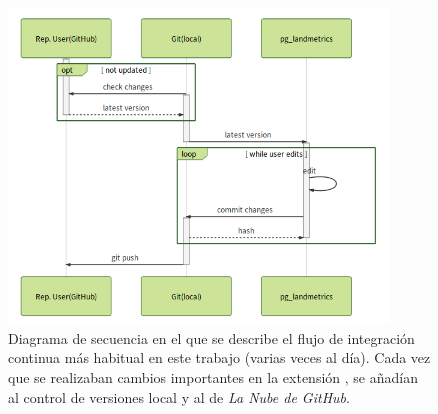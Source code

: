 \begin{itemize}
\begin{figure}
\begin{center}
\includegraphics[width=0.9\textwidth]{Metodologia/Figs/diary.png}
\caption{Diagrama de secuencia en el que se describe el flujo de integración continua más habitual en este trabajo (varias veces al día). Cada vez que se realizaban cambios importantes en la extensión \pgland{}, se añadían al control de versiones local y al de \textit{La Nube de GitHub}. \label{fig:diary}}
\end{center}
\end{figure}


\end{itemize}

